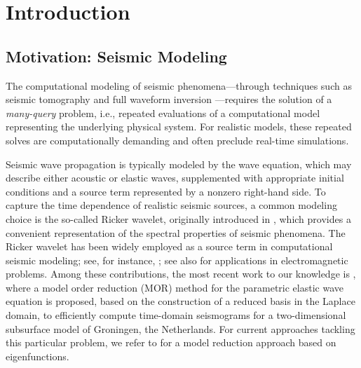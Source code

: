 \section{Introduction}

\subsection{Motivation: Seismic Modeling}
\label{sec:motivation}
The computational modeling of seismic phenomena---through techniques such as seismic tomography
\cite{Rawlinson2014SeismicTomography,Tromp2005AdjointBanana} and full waveform inversion
\cite{Bozdag2011MisfitPhaseEnvelope,Tromp2013FullWaveform}---requires the solution of a
{\it many-query} problem, i.e., repeated evaluations of a computational model representing the
underlying physical system. For realistic models, these repeated solves are computationally
demanding and often preclude real-time simulations. 

Seismic wave propagation is typically modeled by the wave equation, which may describe
either acoustic or elastic waves, supplemented with appropriate initial conditions and
a source term represented by a nonzero right-hand side.
To capture the time dependence of realistic seismic sources, a common modeling choice is
the so-called Ricker wavelet, originally introduced in
\cite{ricker1943further,ricker1944wavelet}, which provides a convenient representation of
the spectral properties of seismic phenomena.
The Ricker wavelet has been widely employed as a source term in computational seismic
modeling; see, for instance,
\cite{komatitsch1999introduction,alford1974accuracy}; see also \cite{schneider2004plane,schneider2025understanding,SchneiderChen2011} for applications in electromagnetic problems.
Among these contributions, the most recent work to our knowledge is \cite{hawkins2025model},
where a model order reduction (MOR) method for the parametric elastic wave equation is
proposed, based on the construction of a reduced basis in the Laplace domain, to efficiently compute time-domain seismograms for a two-dimensional subsurface model of Groningen, the Netherlands.
For current approaches tackling this particular problem, we refer to \cite{Hawkinsetal2023} for a model reduction approach based on eigenfunctions.

